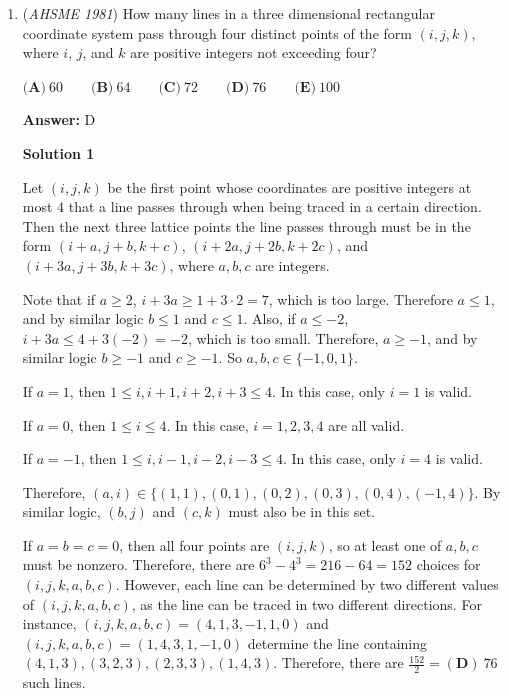 \begin{enumerate}
 



\textbf{Solution 2}


 \[(a+b+c)(a+b-c)=3ab\]
 \[a^2+2ab+b^2-c^2=3ab\]
 \[a^2+b^2-c^2=ab\]
 \[c^2=a^2+b^2-ab\]This looks a lot like Law of Cosines, which is $c^2=a^2+b^2-2ab\cos{c}$.
 \[c^2=a^2+b^2-ab=a^2+b^2-2ab\cos{c}\]
 \[ab=2ab\cos{c}\]
 \[\frac{1}{2}=\cos{c}\]$\cos{c}$ is $\frac{1}{2}$, so the angle opposite side $c$ is $\boxed{60^\circ}$.

 -aopspandy

 


	\item (\textit{AHSME 1981}) How many lines in a three dimensional rectangular coordinate system pass through four distinct points of the form $(i,j,k)$, where $i$, $j$, and $k$ are positive integers not exceeding four?


 $\textbf{(A)}\ 60\qquad\textbf{(B)}\ 64\qquad\textbf{(C)}\ 72\qquad\textbf{(D)}\ 76\qquad\textbf{(E)}\ 100$

 \textbf{Answer: }D



\textbf{Solution 1}

Let $(i, j, k)$ be the first point whose coordinates are positive integers at most $4$ that a line passes through when being traced in a certain direction.  Then the next three lattice points the line passes through must be in the form $(i + a, j + b, k + c)$, $(i + 2a, j + 2b, k + 2c)$, and $(i + 3a, j + 3b, k + 3c)$, where $a, b, c$ are integers.  

 Note that if $a \geq 2$, $i + 3a \geq 1 + 3 \cdot 2 = 7$, which is too large.  Therefore $a \leq 1$, and by similar logic $b \leq 1$ and $c \leq 1$.  Also, if $a \leq -2$, $i + 3a \leq 4 + 3(-2) = -2$, which is too small.  Therefore, $a \geq -1$, and by similar logic $b \geq -1$ and $c \geq -1$.  So $a, b, c \in \{-1, 0, 1\}$.

 If $a = 1$, then $1 \leq i, i+1, i+2, i+3 \leq 4$.  In this case, only $i = 1$ is valid.

 If $a = 0$, then $1 \leq i \leq 4$.  In this case, $i = 1, 2, 3, 4$ are all valid.

 If $a = -1$, then $1 \leq i, i-1, i-2, i-3 \leq 4$.  In this case, only $i = 4$ is valid.

 Therefore, $(a, i) \in \{(1, 1), (0, 1), (0, 2), (0, 3), (0, 4), (-1, 4)\}$.  By similar logic, $(b, j)$ and $(c, k)$ must also be in this set. 

 If $a = b = c = 0$, then all four points are $(i, j, k)$, so at least one of $a, b, c$ must be nonzero.  Therefore, there are $6^3 - 4^3 = 216 - 64 = 152$ choices for $(i, j, k, a, b, c)$.  However, each line can be determined by two different values of $(i, j, k, a, b, c)$, as the line can be traced in two different directions.  For instance, $(i, j, k, a, b, c) = (4, 1, 3, -1, 1, 0)$ and $(i, j, k, a, b, c) = (1, 4, 3, 1, -1, 0)$ determine the line containing $(4, 1, 3), (3, 2, 3), (2, 3, 3), (1, 4, 3)$.  Therefore, there are $\frac{152}{2} = \boxed{(\textbf{D})\ 76}$ such lines.


\end{enumerate}
